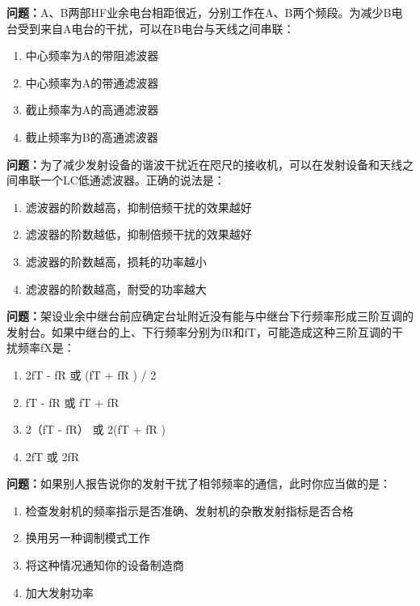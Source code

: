 \bigskip


\noindent\textbf{问题：}A、B两部HF业余电台相距很近，分别工作在A、B两个频段。为减少B电台受到来自A电台的干扰，可以在B电台与天线之间串联：
\begin{enumerate}[label=\Alph*), leftmargin=3em]
	\item 中心频率为A的带阻滤波器
	\item 中心频率为A的带通滤波器
	\item 截止频率为A的高通滤波器
	\item 截止频率为B的高通滤波器
\end{enumerate}

\bigskip


\noindent\textbf{问题：}为了减少发射设备的谐波干扰近在咫尺的接收机，可以在发射设备和天线之间串联一个LC低通滤波器。正确的说法是：
\begin{enumerate}[label=\Alph*), leftmargin=3em]
	\item 滤波器的阶数越高，抑制倍频干扰的效果越好
	\item 滤波器的阶数越低，抑制倍频干扰的效果越好
	\item 滤波器的阶数越高，损耗的功率越小
	\item 滤波器的阶数越高，耐受的功率越大
\end{enumerate}

\bigskip


\noindent\textbf{问题：}架设业余中继台前应确定台址附近没有能与中继台下行频率形成三阶互调的发射台。如果中继台的上、下行频率分别为fR和fT，可能造成这种三阶互调的干扰频率fX是：
\begin{enumerate}[label=\Alph*), leftmargin=3em]
	\item 2fT - fR 或 (fT + fR ) / 2
	\item fT - fR 或 fT + fR
	\item 2（fT - fR） 或 2(fT + fR )
	\item 2fT 或 2fR
\end{enumerate}

\bigskip


\noindent\textbf{问题：}如果别人报告说你的发射干扰了相邻频率的通信，此时你应当做的是：
\begin{enumerate}[label=\Alph*), leftmargin=3em]
	\item 检查发射机的频率指示是否准确、发射机的杂散发射指标是否合格
	\item 换用另一种调制模式工作
	\item 将这种情况通知你的设备制造商
	\item 加大发射功率
\end{enumerate}

